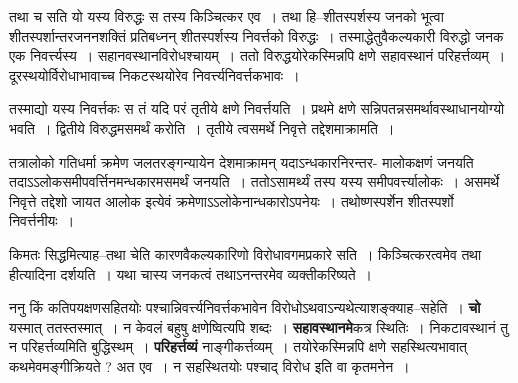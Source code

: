 \documentclass[article,12pt,a4paper]{memoir}
\begin{document}
	  \pstart तथा च सति यो यस्य विरुद्धः स तस्य किञ्चित्कर एव । तथा हि--शीतस्पर्शस्य जनको भूत्वा शीतस्पर्शान्तरजननशक्तिं प्रतिबध्नन् शीतस्पर्शस्य निवर्त्तको विरुद्धः । तस्माद्धेतुवैकल्यकारी विरुद्धो जनक एक निवर्त्त्यस्य । सहानवस्थानविरोधश्चायम् । ततो विरुद्धयोरेकस्मिन्नपि क्षणे सहावस्थानं परिहर्त्तव्यम् । दूरस्थयोर्विरोधाभावाच्च निकटस्थयोरेव निवर्त्त्यनिवर्त्तकभावः ।
	\pend
        

	  \pstart तस्माद्यो यस्य निवर्त्तकः स तं यदि परं तृतीये क्षणे निवर्त्तयति । प्रथमे क्षणे सन्निपतन्नसमर्थावस्थाधानयोग्यो भवति । द्वितीये विरुद्धमसमर्थं करोति । तृतीये त्वसमर्थे निवृत्ते तद्देशमाक्रामति ।
	\pend
        

	  \pstart तत्रालोको गतिधर्मा क्रमेण जलतरङ्गन्यायेन देशमाक्रामन् यदाऽन्धकारनिरन्तर- मालोकक्षणं जनयति तदाऽऽलोकसमीपवर्त्तिनमन्धकारमसमर्थं जनयति । ततोऽसामर्थ्यं तस्प यस्य समीपवर्त्त्यालोकः । असमर्थे निवृत्ते तद्देशो जायत आलोक इत्येवं क्रमेणाऽऽलोकेनान्धकारोऽपनेयः । तथोष्णस्पर्शेन शीतस्पर्शो निवर्त्तनीयः ।
	\pend
      
	  \endgroup
	

	  \pstart किमतः सिद्धमित्याह--तथा चेति कारणवैकल्यकारिणो विरोधावगमप्रकारे सति । किञ्चित्करत्वमेव तथा हीत्यादिना दर्शयति । यथा चास्य जनकत्वं तथाऽनन्तरमेव व्यक्तीकरिष्यते ।
	\pend
      

	  \pstart ननु किं कतिपयक्षणसहितयोः पश्चान्निवर्त्त्यनिवर्त्तकभावेन विरोधोऽथवाऽन्यथेत्याशङ्क्याह--सहेति । \textbf{चो} यस्मात् ततस्तस्मात् । न केवलं बहुषु क्षणेष्वित्यपि शब्दः । \textbf{सहावस्थानमे}कत्र स्थितिः । निकटावस्थानं तु न परिहर्त्तव्यमिति बुद्धिस्थम् । \textbf{परिहर्त्तव्यं} नाङ्गीकर्त्तव्यम् । तयोरेकस्मिन्नपि क्षणे सहस्थित्यभावात् कथमेवमङ्गीक्रियते ? अत एव । न सहस्थितयोः पश्चाद् विरोध इति वा कृतमनेन ।
	\pend
      
\end{document}
